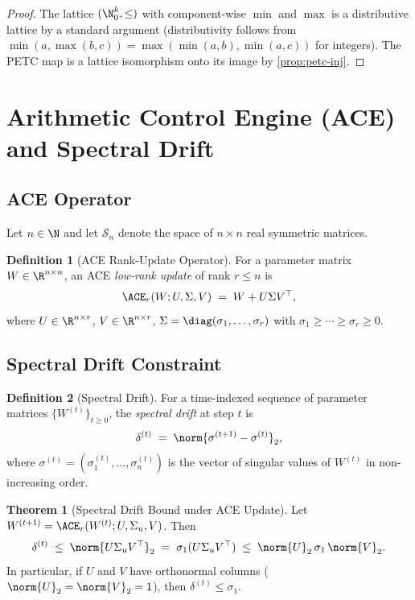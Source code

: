 \documentclass[12pt,letterpaper]{article}
\theoremstyle{definition}
\newtheorem{definition}{Definition}[section]
\newtheorem{theorem}{Theorem}[section]
\theoremstyle{remark}
\begin{document}
\begin{proof}
  The lattice \((\N_0^k, \le)\) with component-wise \(\min\) and \(\max\) is
  a distributive lattice by a standard argument (distributivity follows from
  \(\min(a, \max(b,c)) = \max(\min(a,b), \min(a,c))\) for integers).
  The PETC map is a lattice isomorphism onto its image by
  \cref{prop:petc-inj}.
\end{proof}

\section{Arithmetic Control Engine (ACE) and Spectral Drift}
\label{sec:ace}

\subsection{ACE Operator}
\label{ssec:ace-op}

Let \(n \in \N\) and let \(\mathcal{S}_n\) denote the space of
\(n \times n\) real symmetric matrices.

\begin{definition}[ACE Rank-Update Operator]
  \label{def:ace-op}
  For a parameter matrix \(W \in \R^{n \times n}\), an ACE
  \emph{low-rank update} of rank \(r \le n\) is
  \[
    \ACE_r(W; U, \Sigma, V)
    \;=\; W + U \Sigma V^\top,
  \]
  where \(U \in \R^{n \times r}\), \(V \in \R^{n \times r}\),
  \(\Sigma = \diag(\sigma_1, \ldots, \sigma_r)\) with
  \(\sigma_1 \ge \cdots \ge \sigma_r \ge 0\).
\end{definition}

\subsection{Spectral Drift Constraint}
\label{ssec:spectral-drift}

\begin{definition}[Spectral Drift]
  \label{def:drift}
  For a time-indexed sequence of parameter matrices
  \(\{W^{(t)}\}_{t \ge 0}\), the \emph{spectral drift} at step \(t\) is
  \[
    \delta^{(t)} \;=\; \norm{\sigma^{(t+1)} - \sigma^{(t)}}_2,
  \]
  where \(\sigma^{(t)} = (\sigma_1^{(t)}, \ldots, \sigma_n^{(t)})\) is the
  vector of singular values of \(W^{(t)}\) in non-increasing order.
\end{definition}

\begin{theorem}[Spectral Drift Bound under ACE Update]
  \label{thm:drift-bound}
  Let \(W^{(t+1)} = \ACE_r(W^{(t)}; U, \Sigma_u, V)\).  Then
  \[
    \delta^{(t)} \;\le\; \norm{U \Sigma_u V^\top}_2
    \;=\; \sigma_1(U\Sigma_u V^\top)
    \;\le\; \norm{U}_2\,\sigma_1\,\norm{V}_2.
  \]
  In particular, if \(U\) and \(V\) have orthonormal columns
  (\(\norm{U}_2 = \norm{V}_2 = 1\)), then
  \(\delta^{(t)} \le \sigma_1\).
\end{theorem}
\end{document}
